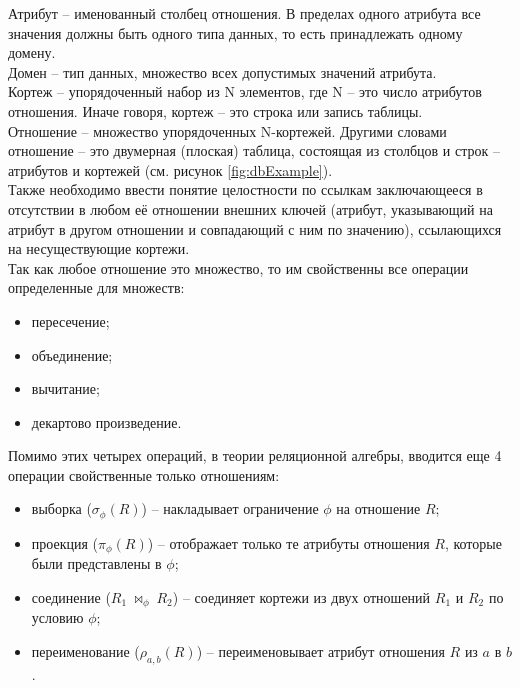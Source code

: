 \indent Атрибут -- именованный столбец отношения.
В пределах одного атрибута все значения должны быть одного типа данных, то есть принадлежать одному домену.\\
\indent Домен -- тип данных, множество всех допустимых значений атрибута.\\
\indent Кортеж -- упорядоченный набор из N элементов, где N -- это число атрибутов отношения.
Иначе говоря, кортеж -- это строка или запись таблицы.\\
\indent Отношение -- множество упорядоченных N-кортежей.
Другими словами отношение -- это двумерная (плоская) таблица, состоящая из столбцов и строк -- атрибутов и кортежей (см. рисунок \ref{fig:dbExample}).\\
\indent Также необходимо ввести понятие целостности по ссылкам заключающееся в отсутствии в любом её отношении внешних ключей (атрибут, указывающий на атрибут в другом отношении и совпадающий с ним по значению), ссылающихся на несуществующие кортежи.\\
\indent Так как любое отношение это множество, то им свойственны все операции определенные для множеств:
\begin{itemize}
	\item пересечение;
	\item объединение;
	\item вычитание;
	\item декартово произведение.
\end{itemize}
\indent Помимо этих четырех операций, в теории реляционной алгебры, вводится еще 4 операции свойственные только отношениям:
\begin{itemize}
	\item выборка ($\sigma_\phi(R)$) -- накладывает ограничение $\phi$ на отношение $R$;
	\item проекция ($\pi_\phi(R)$) -- отображает только те атрибуты отношения $R$, которые были представлены в $\phi$;
	\item соединение ($R_1\ \bowtie_\phi\ R_2$) -- соединяет кортежи из двух отношений $R_1$ и $R_2$ по условию $\phi$;
	\item переименование ($\rho_{a,b}(R)$) -- переименовывает атрибут отношения $R$ из $a$ в $b$ .
\end{itemize}
